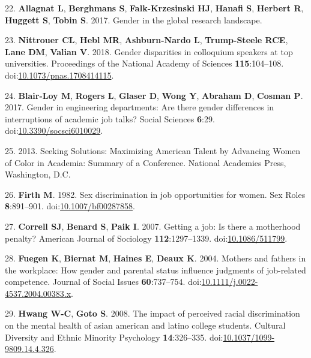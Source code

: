 \documentclass[10pt,]{article}
\begin{document}
\hypertarget{ref-allagnat_gender_2017}{}
22. \textbf{Allagnat L}, \textbf{Berghmans S}, \textbf{Falk-Krzesinski
HJ}, \textbf{Hanafi S}, \textbf{Herbert R}, \textbf{Huggett S},
\textbf{Tobin S}. 2017. Gender in the global research landscape.

\hypertarget{ref-nittrouer_gender_2018}{}
23. \textbf{Nittrouer CL}, \textbf{Hebl MR}, \textbf{Ashburn-Nardo L},
\textbf{Trump-Steele RCE}, \textbf{Lane DM}, \textbf{Valian V}. 2018.
Gender disparities in colloquium speakers at top universities.
Proceedings of the National Academy of Sciences \textbf{115}:104--108.
doi:\href{https://doi.org/10.1073/pnas.1708414115}{10.1073/pnas.1708414115}.

\hypertarget{ref-BlairLoy2017}{}
24. \textbf{Blair-Loy M}, \textbf{Rogers L}, \textbf{Glaser D},
\textbf{Wong Y}, \textbf{Abraham D}, \textbf{Cosman P}. 2017. Gender in
engineering departments: Are there gender differences in interruptions
of academic job talks? Social Sciences \textbf{6}:29.
doi:\href{https://doi.org/10.3390/socsci6010029}{10.3390/socsci6010029}.

\hypertarget{ref-noauthor_seeking_2013}{}
25. 2013. Seeking Solutions: Maximizing American Talent by Advancing
Women of Color in Academia: Summary of a Conference. National Academies
Press, Washington, D.C.

\hypertarget{ref-Firth1982}{}
26. \textbf{Firth M}. 1982. Sex discrimination in job opportunities for
women. Sex Roles \textbf{8}:891--901.
doi:\href{https://doi.org/10.1007/bf00287858}{10.1007/bf00287858}.

\hypertarget{ref-Correll2007}{}
27. \textbf{Correll SJ}, \textbf{Benard S}, \textbf{Paik I}. 2007.
Getting a job: Is there a motherhood penalty? American Journal of
Sociology \textbf{112}:1297--1339.
doi:\href{https://doi.org/10.1086/511799}{10.1086/511799}.

\hypertarget{ref-Fuegen2004}{}
28. \textbf{Fuegen K}, \textbf{Biernat M}, \textbf{Haines E},
\textbf{Deaux K}. 2004. Mothers and fathers in the workplace: How gender
and parental status influence judgments of job-related competence.
Journal of Social Issues \textbf{60}:737--754.
doi:\href{https://doi.org/10.1111/j.0022-4537.2004.00383.x}{10.1111/j.0022-4537.2004.00383.x}.

\hypertarget{ref-Hwang2008}{}
29. \textbf{Hwang W-C}, \textbf{Goto S}. 2008. The impact of perceived
racial discrimination on the mental health of asian american and latino
college students. Cultural Diversity and Ethnic Minority Psychology
\textbf{14}:326--335.
doi:\href{https://doi.org/10.1037/1099-9809.14.4.326}{10.1037/1099-9809.14.4.326}.
\end{document}
